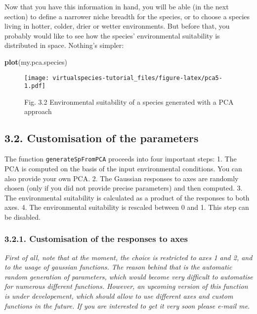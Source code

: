 \documentclass[]{article}
\newenvironment{Shaded}{\begin{snugshade}}{\end{snugshade}}
\newcommand{\KeywordTok}[1]{\textcolor[rgb]{0.13,0.29,0.53}{\textbf{#1}}}
\newcommand{\NormalTok}[1]{#1}
\begin{document}
Now that you have this information in hand, you will be able (in the
next section) to define a narrower niche breadth for the species, or to
choose a species living in hotter, colder, drier or wetter environments.
But before that, you probably would like to see how the species'
environmental suitability is distributed in space. Nothing's simpler:

\begin{Shaded}
\begin{Highlighting}[]
\KeywordTok{plot}\NormalTok{(my.pca.species)}
\end{Highlighting}
\end{Shaded}

\begin{figure}
\centering
\texttt{[image: virtualspecies-tutorial\_files/figure-latex/pca5-1.pdf]}
\caption{Fig. 3.2 Environmental suitability of a species generated with
a PCA approach}
\end{figure}

\subsection{3.2. Customisation of the
parameters}\label{customisation-of-the-parameters}

The function \texttt{generateSpFromPCA} proceeds into four important
steps: 1. The PCA is computed on the basis of the input environmental
conditions. You can also provide your own PCA. 2. The Gaussian responses
to axes are randomly chosen (only if you did not provide precise
parameters) and then computed. 3. The environmental suitability is
calculated as a product of the responses to both axes. 4. The
environmental suitability is rescaled between 0 and 1. This step can be
disabled.

\subsubsection{3.2.1. Customisation of the responses to
axes}\label{customisation-of-the-responses-to-axes}

\emph{First of all, note that at the moment, the choice is restricted to
axes 1 and 2, and to the usage of gaussian functions. The reason behind
that is the automatic random generation of parameters, which would
become very difficult to automatise for numerous different functions.
However, an upcoming version of this function is under developement,
which should allow to use different axes and custom functions in the
future. If you are interested to get it very soon please e-mail me.}
\end{document}
